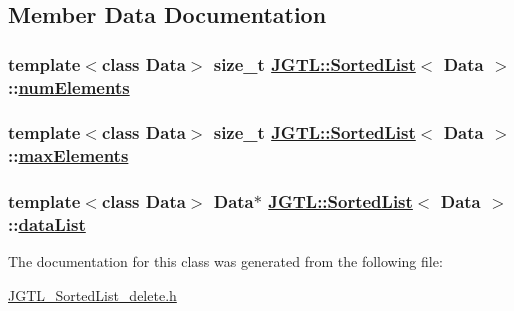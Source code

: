 \subsection{Member Data Documentation}
\hypertarget{class_j_g_t_l_1_1_sorted_list_69b46609908f5d677486ed01749ce515}{
\subsubsection[numElements]{\setlength{\rightskip}{0pt plus 5cm}template$<$class Data$>$ size\_\-t \hyperlink{class_j_g_t_l_1_1_sorted_list}{JGTL::Sorted\-List}$<$ Data $>$::\hyperlink{class_j_g_t_l_1_1_sorted_list_69b46609908f5d677486ed01749ce515}{num\-Elements}}}
\label{class_j_g_t_l_1_1_sorted_list_69b46609908f5d677486ed01749ce515}


\hypertarget{class_j_g_t_l_1_1_sorted_list_263ce05febec35a732661d2c26acb3a3}{
\subsubsection[maxElements]{\setlength{\rightskip}{0pt plus 5cm}template$<$class Data$>$ size\_\-t \hyperlink{class_j_g_t_l_1_1_sorted_list}{JGTL::Sorted\-List}$<$ Data $>$::\hyperlink{class_j_g_t_l_1_1_sorted_list_263ce05febec35a732661d2c26acb3a3}{max\-Elements}}}
\label{class_j_g_t_l_1_1_sorted_list_263ce05febec35a732661d2c26acb3a3}


\hypertarget{class_j_g_t_l_1_1_sorted_list_8315e6bbcf773663fd19c5e369a78b2f}{
\subsubsection[dataList]{\setlength{\rightskip}{0pt plus 5cm}template$<$class Data$>$ Data$\ast$ \hyperlink{class_j_g_t_l_1_1_sorted_list}{JGTL::Sorted\-List}$<$ Data $>$::\hyperlink{class_j_g_t_l_1_1_sorted_list_8315e6bbcf773663fd19c5e369a78b2f}{data\-List}}}
\label{class_j_g_t_l_1_1_sorted_list_8315e6bbcf773663fd19c5e369a78b2f}




The documentation for this class was generated from the following file:\begin{CompactItemize}
\item 
\hyperlink{_j_g_t_l___sorted_list__delete_8h}{JGTL\_\-Sorted\-List\_\-delete.h}\end{CompactItemize}
